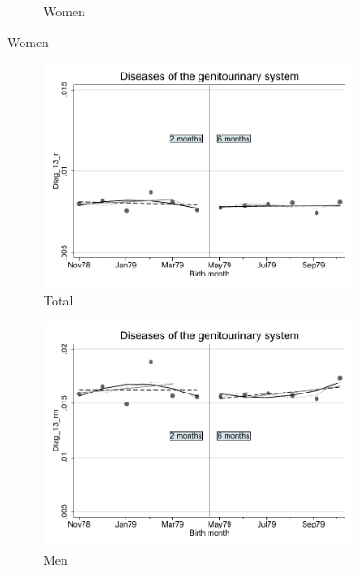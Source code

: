 \documentclass[a4paper ]{article}
\begin{document}
\begin{figure}[h!]
\begin{subfigure}[t]{0.31\textwidth}
		\caption{Women}
	\end{subfigure}
\end{figure}
\newpage
\begin{figure}[h]
	\centering
	\begin{subfigure}[t]{0.31\textwidth}
		\centering
		\includegraphics[width=0.99\textwidth]{R1_RD_Diag_13_r_fits}
		\caption{Total}		
	\end{subfigure}
	\begin{subfigure}[t]{0.31\textwidth}
		\centering
		\includegraphics[width=0.99\textwidth]{R1_RD_Diag_13_rm_fits}
		\caption{Men}		
	\end{subfigure}
	\quad
	\begin{subfigure}[t]{0.31\textwidth}

\end{subfigure}
\end{figure}
\end{document}
